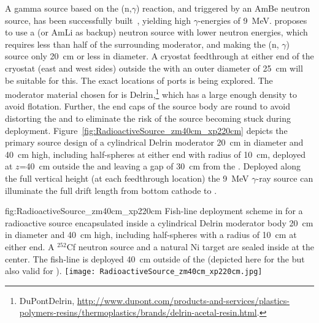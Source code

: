 A gamma source based on the (n,$\gamma$) reaction, and triggered by an AmBe neutron source, has been successfully built~\cite{Rogers:1996ks}, yielding high $\gamma$-energies of \SI{9}{\MeV}.  %
proposes to use a  (or AmLi as backup) neutron source with lower neutron energies, which requires less than half of the surrounding moderator, and making the  (n, $\gamma$) source only \SI{20}{\cm} or less in diameter. A cryostat feedthrough at either end of the cryostat (east and west sides) outside the  with an outer diameter of \SI{25}{\cm} will be suitable for this. The exact locations of ports is being explored.
 The moderator material chosen for  is Delrin,\footnote{DuPont\texttrademark Delrin\textregistered, \url{http://www.dupont.com/products-and-services/plastics-polymers-resins/thermoplastics/brands/delrin-acetal-resin.html}.} which has a large enough density to avoid flotation. Further, the end caps of the source
body are round to avoid distorting the \efield and to
eliminate the risk of the source becoming stuck during deployment. 
Figure~\ref{fig:RadioactiveSource_zm40cm_xp220cm} depicts the primary source design of a cylindrical Delrin moderator \SI{20}{\cm} in diameter and \SI{40}{\cm} high, including half-spheres at either end with
radius of \SI{10}{\cm}, deployed at $z$=\SI{40}{\cm} outside the  and leaving a gap of \SI{30}{\cm} from the . Deployed along the full vertical height (at each feedthrough location) the 9~MeV $\gamma$-ray source can illuminate the full drift length from bottom cathode to .

\begin{dunefigure}
{fig:RadioactiveSource_zm40cm_xp220cm}
{Fish-line deployment scheme in  for a radioactive source encapsulated inside a cylindrical Delrin moderator body \SI{20}{\cm} in diameter and \SI{40}{\cm} high, including half-spheres with a radius of \SI{10}{\cm} at either end. A $^{252}$Cf neutron source and a natural Ni target are sealed inside at the center. The fish-line is deployed \SI{40}{\cm} outside of the   (depicted here for the  but also valid for ).
}
\texttt{[image: RadioactiveSource\_zm40cm\_xp220cm.jpg]}
\end{dunefigure}

